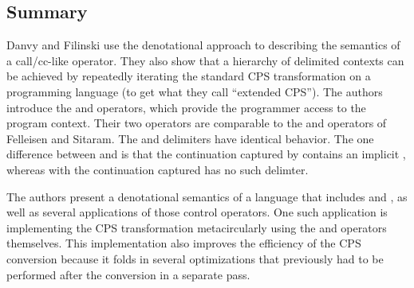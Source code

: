 \documentclass[letterpaper]{llncs}
\begin{document}
\subsection*{Summary}

Danvy and Filinski use the denotational approach to describing the semantics of a call/cc-like operator. They also show that a hierarchy of delimited contexts can be achieved by repeatedly iterating the standard CPS transformation on a programming language (to get what they call ``extended CPS''). The authors introduce the \shiftfn and \resetfn operators, which provide the programmer access to the program context. Their two operators are comparable to the \ctrl and \prompt operators of Felleisen and Sitaram. The \prompt and \resetfn delimiters have identical behavior. The one difference between \shiftfn and \ctrl is that the continuation captured by \shiftfn contains an implicit \resetfn, whereas with the continuation captured \ctrl has no such delimter.

The authors present a denotational semantics of a language that includes \shiftfn and \resetfn, as well as several applications of those control operators. One such application is implementing the CPS transformation metacircularly using the \shiftfn and \resetfn operators themselves. This implementation also improves the efficiency of the CPS conversion because it folds in several optimizations that previously had to be performed after the conversion in a separate pass.








\end{document}
